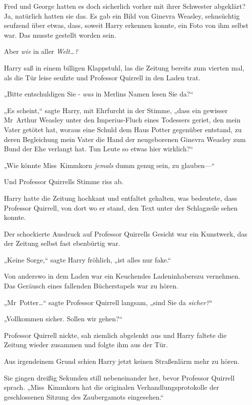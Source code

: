 {Fred und George hatten es doch sicherlich vorher mit ihrer Schwester abgeklärt? Ja, natürlich hatten sie das. Es gab ein Bild von Ginevra Weasley, sehnsüchtig seufzend über etwas, dass, soweit Harry erkennen konnte, ein Foto von ihm selbst war. Das musste gestellt worden sein.

Aber \emph{wie} in aller \emph{Welt…?}

Harry saß in einem billigen Klappstuhl, las die Zeitung bereits zum vierten mal, als die Tür leise seufzte und Professor Quirrell in den Laden trat.

„Bitte entschuldigen Sie - \emph{was} in Merlins Namen lesen Sie da?“

„Es scheint,“ sagte Harry, mit Ehrfurcht in der Stimme, „dass ein gewisser Mr~Arthur Weasley unter den Imperius-Fluch eines Todessers geriet, den mein Vater getötet hat, woraus eine Schuld dem Haus Potter gegenüber entstand, zu deren Begleichung mein Vater die Hand der neugeborenen Ginevra Weasley zum Bund der Ehe verlangt hat. Tun Leute so etwas hier wirklich?“

„Wie könnte Miss~Kimmkorn \emph{jemals} dumm genug sein, zu glauben—“

Und Professor Quirrells Stimme riss ab.

Harry hatte die Zeitung hochkant und entfaltet gehalten, was bedeutete, dass Professor Quirrell, von dort wo er stand, den Text unter der Schlagzeile sehen konnte.

Der schockierte Ausdruck auf Professor Quirrells Gesicht war ein Kunstwerk, das der Zeitung selbst fast ebenbürtig war.

„Keine Sorge,“ sagte Harry fröhlich, „ist alles nur fake.“

Von anderswo in dem Laden war ein Keuchendes Ladeninhaberszu vernehmen. Das Geräusch eines fallenden Bücherstapels war zu hören.

„Mr~Potter…“ sagte Professor Quirrell langsam, „sind Sie da \emph{sicher?}“

„Vollkommen sicher. Sollen wir gehen?“

Professor Quirrell nickte, sah ziemlich abgelenkt aus und Harry faltete die Zeitung wieder zusammen und folgte ihm aus der Tür.

Aus irgendeinem Grund schien Harry jetzt keinen Straßenlärm mehr zu hören.

Sie gingen dreißig Sekunden still nebeneinander her, bevor Professor Quirrell sprach. „Miss~Kimmkorn hat die originalen Verhandlungsprotokolle der geschlossenen Sitzung des Zaubergamots eingesehen.“

}
